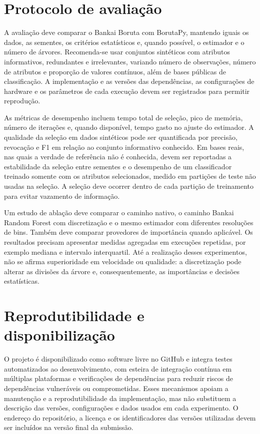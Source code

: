 \documentclass[a4,11pt]{wmecai}
\begin{document}
\section{Protocolo de avaliação}
A avaliação deve comparar o Bankai Boruta com BorutaPy, mantendo iguais os dados, as sementes, os critérios estatísticos e, quando possível, o estimador e o número de árvores. Recomenda-se usar conjuntos sintéticos com atributos informativos, redundantes e irrelevantes, variando número de observações, número de atributos e proporção de valores contínuos, além de bases públicas de classificação. A implementação e as versões das dependências, as configurações de hardware e os parâmetros de cada execução devem ser registrados para permitir reprodução.

As métricas de desempenho incluem tempo total de seleção, pico de memória, número de iterações e, quando disponível, tempo gasto no ajuste do estimador. A qualidade da seleção em dados sintéticos pode ser quantificada por precisão, revocação e F1 em relação ao conjunto informativo conhecido. Em bases reais, nas quais a verdade de referência não é conhecida, devem ser reportadas a estabilidade da seleção entre sementes e o desempenho de um classificador treinado somente com os atributos selecionados, medido em partições de teste não usadas na seleção. A seleção deve ocorrer dentro de cada partição de treinamento para evitar vazamento de informação.

Um estudo de ablação deve comparar o caminho nativo, o caminho Bankai Random Forest com discretização e o mesmo estimador com diferentes resoluções de bins. Também deve comparar provedores de importância quando aplicável. Os resultados precisam apresentar medidas agregadas em execuções repetidas, por exemplo mediana e intervalo interquartil. Até a realização desses experimentos, não se afirma superioridade em velocidade ou qualidade: a discretização pode alterar as divisões da árvore e, consequentemente, as importâncias e decisões estatísticas.

\section{Reprodutibilidade e disponibilização}
O projeto é disponibilizado como software livre no GitHub e integra testes automatizados ao desenvolvimento, com esteira de integração contínua em múltiplas plataformas e verificações de dependências para reduzir riscos de dependências vulneráveis ou comprometidas. Esses mecanismos apoiam a manutenção e a reprodutibilidade da implementação, mas não substituem a descrição das versões, configurações e dados usados em cada experimento. O endereço do repositório, a licença e os identificadores das versões utilizadas devem ser incluídos na versão final da submissão.
\end{document}
